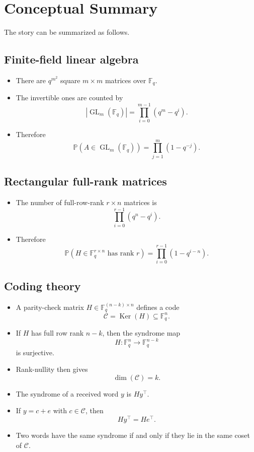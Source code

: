 \documentclass[11pt]{article}
\newcommand{\F}{\mathbb{F}}
\newcommand{\GL}{\operatorname{GL}}
\newcommand{\Ker}{\operatorname{Ker}}
\newcommand{\Prob}{\mathbb{P}}
\newcommand{\cC}{\mathcal{C}}
\theoremstyle{definition}
\theoremstyle{plain}
\begin{document}
	\section{Conceptual Summary}
	
	The story can be summarized as follows.
	
	\subsection*{Finite-field linear algebra}
	
	\begin{itemize}[leftmargin=2em]
		\item There are \(q^{m^2}\) square \(m\times m\) matrices over \(\F_q\).
		\item The invertible ones are counted by
		\[
		|\GL_m(\F_q)|=\prod_{i=0}^{m-1}(q^m-q^i).
		\]
		\item Therefore
		\[
		\Prob(A\in \GL_m(\F_q))=\prod_{j=1}^{m}(1-q^{-j}).
		\]
	\end{itemize}
	
	\subsection*{Rectangular full-rank matrices}
	
	\begin{itemize}[leftmargin=2em]
		\item The number of full-row-rank \(r\times n\) matrices is
		\[
		\prod_{i=0}^{r-1}(q^n-q^i).
		\]
		\item Therefore
		\[
		\Prob(H\in \F_q^{r\times n} \text{ has rank }r)=\prod_{i=0}^{r-1}(1-q^{i-n}).
		\]
	\end{itemize}
	
	\subsection*{Coding theory}
	
	\begin{itemize}[leftmargin=2em]
		\item A parity-check matrix \(H\in \F_q^{(n-k)\times n}\) defines a code
		\[
		\cC=\Ker(H)\subseteq \F_q^n.
		\]
		\item If \(H\) has full row rank \(n-k\), then the syndrome map
		\[
		H:\F_q^n\to \F_q^{n-k}
		\]
		is surjective.
		\item Rank-nullity then gives
		\[
		\dim(\cC)=k.
		\]
		\item The syndrome of a received word \(y\) is \(Hy^\top\).
		\item If \(y=c+e\) with \(c\in \cC\), then
		\[
		Hy^\top=He^\top.
		\]
		\item Two words have the same syndrome if and only if they lie in the same coset of \(\cC\).
	\end{itemize}
	
\end{document}
